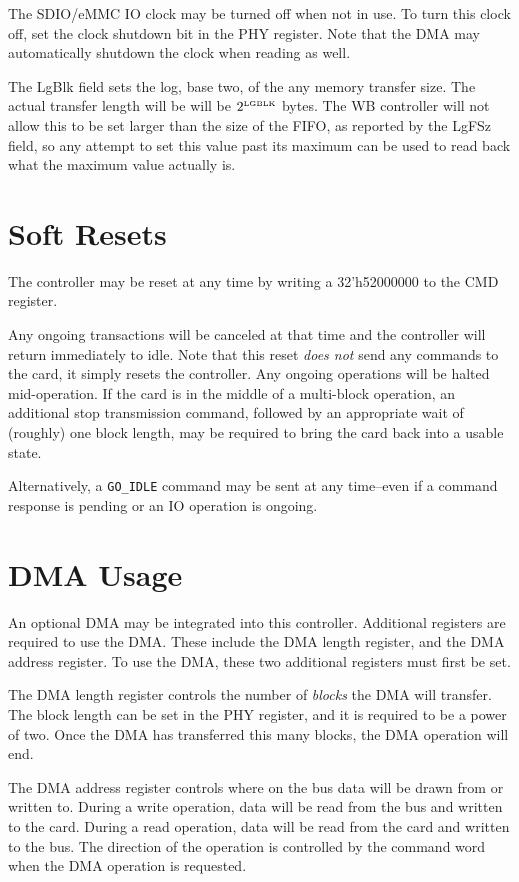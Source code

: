\documentclass{gqtekspec}
\begin{document}
The SDIO/eMMC IO clock may be turned off when not in use.  To turn this clock
off, set the clock shutdown bit in the PHY register.  Note that the DMA may
automatically shutdown the clock when reading as well.

The LgBlk field sets the log, base two, of the any memory transfer size.  The
actual transfer length will be will be $2^{\mbox{\tiny LGBLK}}$ bytes.  The
WB controller will not allow this to be set larger than the size of the FIFO,
as reported by the LgFSz field, so any attempt to set this value past its
maximum can be used to read back what the maximum value actually is.
\section{Soft Resets}
The controller may be reset at any time by writing a 32'h52000000 to the
CMD register.

Any ongoing transactions will be canceled at that time and the controller will
return immediately to idle.  Note that this reset {\em does not} send any
commands to the card, it simply resets the controller.  Any ongoing operations
will be halted mid-operation.  If the card is in the middle of a multi-block
operation, an additional stop transmission command, followed by an appropriate
wait of (roughly) one block length, may be required to bring the card back into
a usable state.

Alternatively, a {\tt GO\_IDLE} command may be sent at any time--even if
a command response is pending or an IO operation is ongoing.
\section{DMA Usage}
An optional DMA may be integrated into this controller.  Additional registers
are required to use the DMA.  These include the DMA length register, and the
DMA address register.  To use the DMA, these two additional registers must
first be set.

The DMA length register controls the number of {\em blocks} the DMA will
transfer.  The block length can be set in the PHY register, and it is required
to be a power of two.  Once the DMA has transferred this many blocks, the
DMA operation will end.

The DMA address register controls where on the bus data will be drawn from
or written to.  During a write operation, data will be read from the bus
and written to the card.  During a read operation, data will be read from
the card and written to the bus.  The direction of the operation is controlled
by the command word when the DMA operation is requested.
\end{document}

